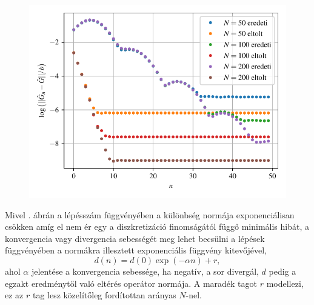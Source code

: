 \begin{figure}[H]
	\centering
	\includegraphics[scale=1]{./figs/convergencerate.pdf}
	\caption[A Green-függvény perturbációs sorának konvergencia sebessége]{}
	\label{perturbation:covergencerate}
\end{figure}
Mivel . ábrán a lépésszám függvényében a különbség normája exponenciálisan csökken amíg el nem ér egy a diszkretizáció finomságától függő minimális hibát, a konvergencia vagy divergencia sebességét meg lehet becsülni a lépések függvényében a normákra illesztett exponenciális függvény kitevőjével,
\begin{equation}
	d(n) = d(0)\exp(-\alpha n)+r,
	\label{perturbation:fit}
\end{equation}
ahol $\alpha$ jelentése a konvergencia sebessége, ha negatív, a sor divergál, $d$ pedig a egzakt eredménytől való eltérés operátor normája. A maradék tagot $r$ modellezi, ez az $r$ tag lesz közelítőleg fordítottan arányas $N$-nel. 
